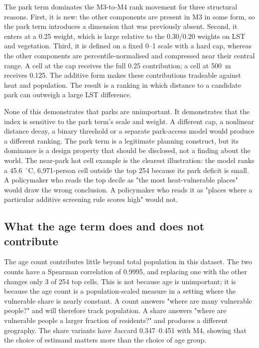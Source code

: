 \documentclass[times,twoside]{_Templates/MultiTargetManuscript}
\begin{document}
The park term dominates the M3-to-M4 rank movement for three structural reasons.
First, it is new: the other components are present in M3 in some form, so the
park term introduces a dimension that was previously absent. Second, it enters at
a 0.25 weight, which is large relative to the 0.30/0.20 weights on LST and
vegetation. Third, it is defined on a fixed 0--1 scale with a hard cap, whereas
the other components are percentile-normalised and compressed near their central
range. A cell at the cap receives the full 0.25 contribution; a cell at 500~m
receives 0.125. The additive form makes these contributions tradeable against
heat and population. The result is a ranking in which distance to a candidate
park can outweigh a large LST difference.

None of this demonstrates that parks are unimportant. It demonstrates that the
index is sensitive to the park term's scale and weight. A different cap, a
nonlinear distance decay, a binary threshold or a separate park-access model
would produce a different ranking. The park term is a legitimate planning
construct, but its dominance is a design property that should be disclosed, not
a finding about the world. The near-park hot cell example is the clearest
illustration: the model ranks a 45.6~$^\circ$C, 6,971-person cell outside the top
254 because its park deficit is small. A policymaker who reads the top decile as
"the most heat-vulnerable places" would draw the wrong conclusion. A
policymaker who reads it as "places where a particular additive screening rule
scores high" would not.

\subsection{What the age term does and does not contribute}

The age count contributes little beyond total population in this dataset. The
two counts have a Spearman correlation of 0.9995, and replacing one with the
other changes only 3 of 254 top cells. This is not because age is unimportant;
it is because the age count is a population-scaled measure in a setting where the
vulnerable share is nearly constant. A count answers "where are many vulnerable
people?" and will therefore track population. A share answers "where are
vulnerable people a larger fraction of residents?" and produces a different
geography. The share variants have Jaccard 0.347--0.451 with M4, showing that the
choice of estimand matters more than the choice of age group.
\end{document}
